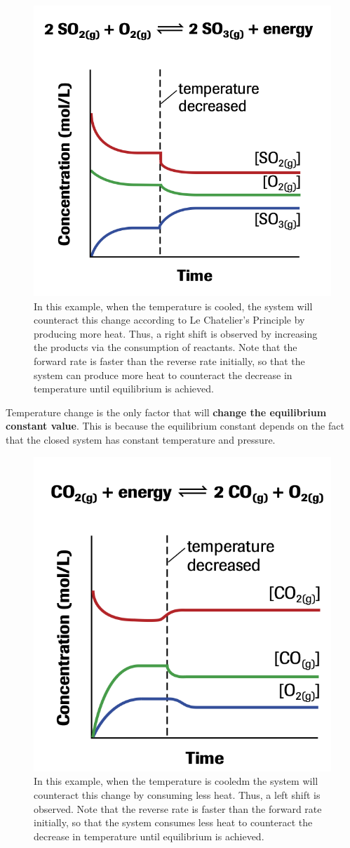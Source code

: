 \begin{figure}[ht!]
    \centering
    \includegraphics[width=0.4 \textwidth]{../figures/sulfur-trioxide-synthesis-equilibrium-shift.png}
    \caption{In this example, when the temperature is cooled, the system will counteract this change
    according to Le Chatelier's Principle by producing more heat. Thus, a right shift is observed by
    increasing the products via the consumption of reactants. Note that the forward rate is faster
    than the reverse rate initially, so that the system can produce more heat to counteract the
    decrease in temperature until equilibrium is achieved.}
\end{figure}

\begin{important}
    Temperature change is the only factor that will \textbf{change the equilibrium constant value}.
    This is because the equilibrium constant depends on the fact that the closed system has constant
    temperature and pressure.
\end{important}

\begin{figure}[ht!]
    \centering
    \includegraphics[width=0.4 \textwidth]{../figures/carbon-dioxide-decomposition-equilibrium-shift.png}
    \caption{In this example, when the temperature is cooledm the system will counteract this change
    by consuming less heat. Thus, a left shift is observed. Note that the reverse rate is faster than
    the forward rate initially, so that the system consumes less heat to counteract the decrease in 
    temperature until equilibrium is achieved.}
\end{figure}

